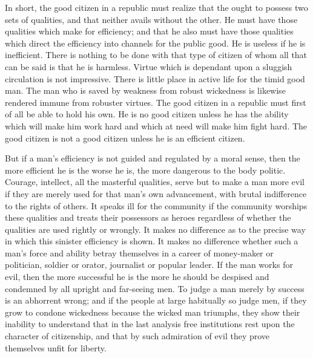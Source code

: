 \documentclass[a4paper]{amsbook}
\begin{document}
In short, the good citizen in a republic must realize that the ought to possess two sets of qualities, and that neither avails without the other. He must have those qualities which make for efficiency; and that he also must have those qualities which direct the efficiency into channels for the public good. He is useless if he is inefficient. There is nothing to be done with that type of citizen of whom all that can be said is that he is harmless. Virtue which is dependant upon a sluggish circulation is not impressive. There is little place in active life for the timid good man. The man who is saved by weakness from robust wickedness is likewise rendered immune from robuster virtues. The good citizen in a republic must first of all be able to hold his own. He is no good citizen unless he has the ability which will make him work hard and which at need will make him fight hard. The good citizen is not a good citizen unless he is an efficient citizen.

But if a man's efficiency is not guided and regulated by a moral sense, then the more efficient he is the worse he is, the more dangerous to the body politic. Courage, intellect, all the masterful qualities, serve but to make a man more evil if they are merely used for that man's own advancement, with brutal indifference to the rights of others. It speaks ill for the community if the community worships these qualities and treats their possessors as heroes regardless of whether the qualities are used rightly or wrongly. It makes no difference as to the precise way in which this sinister efficiency is shown. It makes no difference whether such a man's force and ability betray themselves in a career of money-maker or politician, soldier or orator, journalist or popular leader. If the man works for evil, then the more successful he is the more he should be despised and condemned by all upright and far-seeing men. To judge a man merely by success is an abhorrent wrong; and if the people at large habitually so judge men, if they grow to condone wickedness because the wicked man triumphs, they show their inability to understand that in the last analysis free institutions rest upon the character of citizenship, and that by such admiration of evil they prove themselves unfit for liberty.
\end{document}
